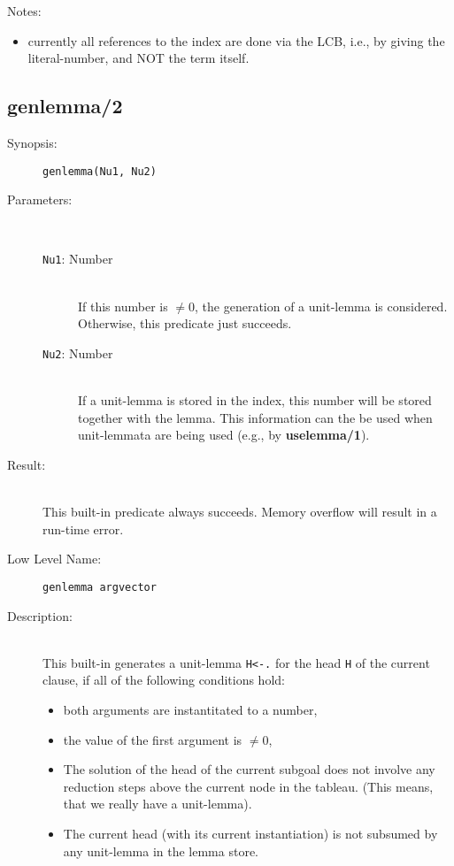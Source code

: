 


Notes:
\begin{itemize}
\item
currently all references to the index are done via the LCB,
i.e., by giving the literal-number, and NOT the term itself.
\end{itemize}

\subsection{genlemma/2}

\begin{description}
\item[Synopsis:]
	{\tt genlemma(Nu1, Nu2)}
\item[Parameters:]\ \\
	\begin{description}
	\item[{\tt Nu1}: Number]\ \\
	If this number is $\neq 0$, the generation of a unit-lemma
	is considered. Otherwise, this predicate just succeeds.
	\item[{\tt Nu2}: Number]\ \\
	If a unit-lemma is stored in the index, this number will be
	stored together with the lemma. This information can the
	be used when unit-lemmata are being used (e.g., by {\bf uselemma/1}).
	\end{description}
\item[Result:]\ \\
	This built-in predicate always succeeds. Memory overflow
	will result in a run-time error.
\item[Low Level Name:]
	{\tt genlemma argvector}

\item[Description:]\ \\
This built-in generates a unit-lemma {\tt H<-.} for the
head {\tt H} of the current clause, if all of the following
conditions hold:
\begin{itemize}
\item
both arguments are instantitated to a number,
\item
the value of the first argument is $\neq 0$,
\item
The solution of the head of the current subgoal does not involve
any reduction steps above the current node in the tableau.
(This means, that we really have a unit-lemma).
\item
The current head (with its current instantiation) is not subsumed
by any unit-lemma in the lemma store.
\end{itemize}


\end{description}
